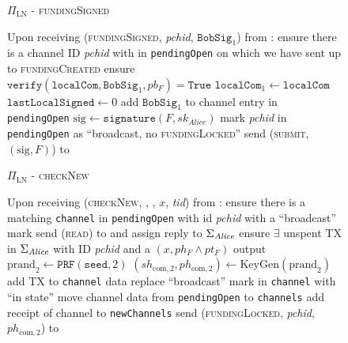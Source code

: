\begin{figure}[!htbp]
\begin{protocolbox}{$\Pi_{\mathrm{LN}}$ - \textsc{fundingSigned}}
  \begin{algorithmic}[1]
    \State Upon receiving (\textsc{fundingSigned}, \textit{pchid},
    $\mathtt{BobSig}_1$) from \bob:
    \Indent
      \State ensure there is a channel ID \textit{pchid} with \bob{} in
      \texttt{pendingOpen} on which we have sent up to \textsc{fundingCreated}
      \State ensure $\mathtt{verify}\left(\mathtt{localCom}, \mathtt{BobSig}_1,
      pb_F\right) = \mathtt{True}$
      \State $\mathtt{localCom}_1 \gets \mathtt{localCom}$
      \State $\mathtt{lastLocalSigned} \gets 0$
      \State add $\mathtt{BobSig}_1$ to channel entry in \texttt{pendingOpen}
      \State $\mathrm{sig} \gets \mathtt{signature}\left(F,
      sk_{\mathit{Alice}}\right)$
      \State mark \textit{pchid} in \texttt{pendingOpen} as ``broadcast, no
      \textsc{fundingLocked}''
      \State send (\textsc{submit}, $\left(\mathrm{sig}, F\right)$) to \ledger
    \EndIndent
  \end{algorithmic}
\end{protocolbox}
\caption{}
\label{alg:protocol:open:fundingSigned}
\end{figure}

\begin{figure}[!htbp]
\begin{protocolbox}{$\Pi_{\mathrm{LN}}$ - \textsc{checkNew}}
  \begin{algorithmic}[1]
    \State {}
    \State Upon receiving (\textsc{checkNew}, \alice, \bob, $x$, \textit{tid})
    from \environment: 
    \Indent
      \State ensure there is a matching \texttt{channel} in \texttt{pendingOpen}
      with id \textit{pchid} with a ``broadcast'' mark
      \State send (\textsc{read}) to \ledger{} and assign reply to
      $\Sigma_{\mathit{Alice}}$
      \State ensure $\exists$ unspent TX in $\Sigma_{\mathit{Alice}}$ with ID
      \textit{pchid} and a $\left(x, ph_F \wedge pt_F\right)$ output
      \State $\mathrm{prand}_2 \gets \texttt{PRF}\left(\mathtt{seed}, 2\right)$
      \State $\left(sh_{\mathrm{com}, 2}, ph_{\mathrm{com}, 2}\right) \gets
      \mathrm{KeyGen}\left(\mathrm{prand}_2\right)$
      \State add TX to \texttt{channel} data \State replace ``broadcast'' mark
      in \texttt{channel} with ``in state''
        \State move channel data from \texttt{pendingOpen} to \texttt{channels}
        \State add receipt of channel to \texttt{newChannels}
      \EndIf
      \State send (\textsc{fundingLocked}, \textit{pchid}, $ph_{\mathrm{com},
      2}$) to \bob{}
    \EndIndent
  \end{algorithmic}
\end{protocolbox}
\caption{}
\label{alg:protocol:open:checkNew}
\end{figure}

